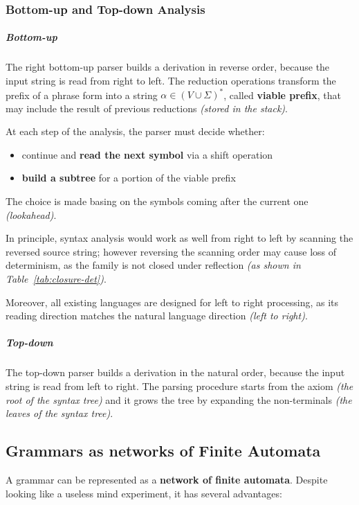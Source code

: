 \documentclass[english]{article}
\begin{document}
\subsubsection{Bottom-up and Top-down Analysis}

\subparagraph*{Bottom-up}

The right bottom-up parser builds a derivation in reverse order, because the input string is read from right to left.
The reduction operations transform the prefix of a phrase form into a string \(\alpha \in \left( V \cup \Sigma \right)^\ast\), called \textbf{viable prefix}, that may include the result of previous reductions \textit{(stored in the stack)}.

At each step of the analysis, the parser must decide whether:

\begin{itemize}
  \item continue and \textbf{read the next symbol} via a shift operation
  \item \textbf{build a subtree} for a portion of the viable prefix
\end{itemize}

The choice is made basing on the symbols coming after the current one \textit{(lookahead)}.

\bigskip
In principle, syntax analysis would work as well from right to left by scanning the reversed source string;
however reversing the scanning order may cause loss of determinism, as the \DET family is not closed under reflection \textit{(as shown in Table~\ref{tab:closure-det})}.

Moreover, all existing languages are designed for left to right processing, as its reading direction matches the natural language direction \textit{(left to right)}.

\subparagraph*{Top-down}

The top-down parser builds a derivation in the natural order, because the input string is read from left to right.
The parsing procedure starts from the axiom \textit{(the root of the syntax tree)} and it grows the tree by expanding the non-terminals \textit{(the leaves of the syntax tree)}.

\subsection{Grammars as networks of Finite Automata}

A grammar can be represented as a \textbf{network of finite automata}.
Despite looking like a useless mind experiment, it has several advantages:
\end{document}

